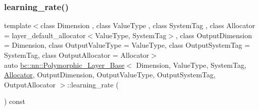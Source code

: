 \mbox{\label{structbc_1_1nn_1_1Polymorphic__Layer__Base_a1b07bace4eb7d7255881d13358c29d26}} 
\subsubsection{\texorpdfstring{learning\+\_\+rate()}{learning\_rate()}\hspace{0.1cm}{\footnotesize\ttfamily [2/2]}}
{\footnotesize\ttfamily template$<$class Dimension , class Value\+Type , class System\+Tag , class Allocator  = layer\+\_\+default\+\_\+allocator$<$\+Value\+Type, System\+Tag$>$, class Output\+Dimension  = Dimension, class Output\+Value\+Type  = Value\+Type, class Output\+System\+Tag  = System\+Tag, class Output\+Allocator  = Allocator$>$ \\
auto \hyperlink{structbc_1_1nn_1_1Polymorphic__Layer__Base}{bc\+::nn\+::\+Polymorphic\+\_\+\+Layer\+\_\+\+Base}$<$ Dimension, Value\+Type, System\+Tag, \hyperlink{classbc_1_1allocators_1_1Allocator}{Allocator}, Output\+Dimension, Output\+Value\+Type, Output\+System\+Tag, Output\+Allocator $>$\+::learning\+\_\+rate (\begin{DoxyParamCaption}{ }\end{DoxyParamCaption}) const\hspace{0.3cm}{\ttfamily [inline]}}

\mbox{\label{structbc_1_1nn_1_1Polymorphic__Layer__Base_ab22a722386024a1329715e738d57814c}} 
